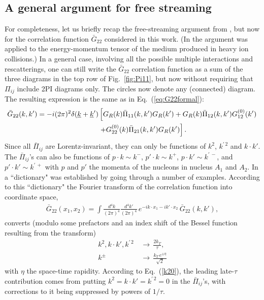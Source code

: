 \documentclass[onecolumn,showpacs,nobibnotes,nofootinbib,12pt,aps,prd,showpacs,notitlepage,nofootinbib,preprintnumbers,amsmath,amssymb]{article}
\def\eq#1{{Eq.~(\ref{#1})}}
\def\fig#1{{Fig.~\ref{#1}}}
\begin{document}

\subsection{A general argument for free streaming} 

For completeness, let us briefly recap the free-streaming argument
from \cite{Kovchegov:2005ss}, but now for the correlation function
$\bar G_{22}$ considered in this work. (In \cite{Kovchegov:2005ss} the
argument was applied to the energy-momentum tensor of the medium
produced in heavy ion collisions.)  In a general case, involving all
the possible multiple interactions and rescatterings, one can still
write the $\bar G_{22}$ correlation function as a sum of the three
diagrams in the top row of \fig{fig:Pi11}, but now without requiring
that $\Pi_{ij}$ include 2PI diagrams only. The circles now denote any
(connected) diagram. The resulting expression is the same as in
\eq{eq:G22formal}:
\begin{align}\label{G1}
  \bar G_{22} (k, k')= - i
  (2\pi)^2\delta(\underline{k}+\underline{k}') & \left[ G_R(k) {\bar
      \Pi}_{11} (k, k') G_R (k') + G_R (k) {\bar \Pi}_{12} (k, k')
    G_{12}^{(0)} (k') \right. \notag \\ & \left.  + G_{22}^{(0)} (k)
    {\bar \Pi}_{21} (k, k') G_R(k') \right] .
\end{align}
Since all ${\bar \Pi}_{ij}$ are Lorentz-invariant, they can only be
functions of $k^2$, $k^{\prime \, 2}$ and $k \cdot k'$. The ${\bar
  \Pi}_{ij}$'s can also be functions of $p \cdot k \sim k^-$, $p'
\cdot k \sim k^+$, $p \cdot k' \sim k^{\prime \, -}$, and $p' \cdot k'
\sim k^{\prime \, +}$ with $p$ and $p'$ the momenta of the nucleons in
nucleus $A_1$ and $A_2$. In \cite{Kovchegov:2005ss} a ``dictionary"
was established by going through a number of examples. According to
this ``dictionary" the Fourier transform of the correlation function
into coordinate space,
\begin{align}
  \bar G_{22} (x_1 , x_2) = \int \frac{d^4 k}{(2 \pi)^4} \frac{d^4
    k'}{(2 \pi)^4} \, e^{- i k \cdot x_1 - i k' \cdot x_2} \, \bar
  G_{22} (k, k'),
\end{align}
converts (modulo some prefactors and an index shift of the Bessel
function resulting from the transform)
\begin{subequations}
\begin{align}
  k^2, k \cdot k', k^{\prime \, 2} \, & \longrightarrow \,
  \frac{2 k_T}{\tau}, \label{k20} \\
  k^\pm \, & \longrightarrow \, \frac{k_T \, e^{\pm
      \eta}}{\sqrt{2}} \label{kplus}
\end{align}
\end{subequations}
with $\eta$ the space-time rapidity. According to \eq{k20}, the
leading late-$\tau$ contribution comes from putting $k^2 = k \cdot k'
= k^{\prime \, 2} =0$ in the ${\bar \Pi}_{ij}$'s, with corrections to
it being suppressed by powers of $1/\tau$.
\end{document}
